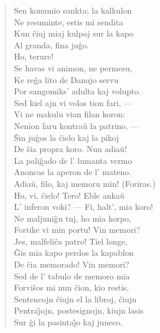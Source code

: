 \begin{verse}
                Sen komunio sankta; la kalkulon\\
                Ne resuminte, estis mi sendita\\
                Kun ĉiuj miaj kulpoj sur la kapo\\
                Al granda, fina ju\^go.\\
 Ho, terure!\\
 Se havas vi animon, ne permesu,\\
                Ke re\^ga lito de Danujo servu\\
                Por sangomiks' adulta kaj volupto.\\
                Sed kiel ajn vi volos tion fari, ---\\
                Vi ne makulu vian filan koron:\\
                Nenion faru kontra\u u la patrino, ---\\
                \^Sin ju\^gos la \^cielo kaj la pikoj\\
                De \^sia propra koro. Nun adia\u u!\\
                La pali\^gado de l' lumanta vermo\\
                Anoncas la aperon de l' mateno.\\
                Adia\u u, filo, kaj memoru min! {\footnotesize (Foriras.)}\\
 Ho, vi, \^cielo! Tero! Eble anka\u u\\
                L' inferon voki? --- Fi, halt', mia koro!\\
                Ne maljuni\^gu tuj, ho mia korpo,\\
                Fortike vi min portu! Vin memori?\\
                Jes, malfeli\^ca patro! Tiel longe,\\
                \^Gis mia kapo perdos la kapablon\\
                De \^cia memorado! Vin memori?\\
                Sed de l' tabulo de memoro mia\\
                Forvi\^sos mi nun \^cion, kio restis,\\
                Sentencojn ĉiujn el la libroj, ĉiujn\\
                Pentra\^{\j}ojn, postesignojn, kiujn lasis\\
                Sur \^gi la pasinta\^{\j}o kaj juneco,\\

\end{verse}
